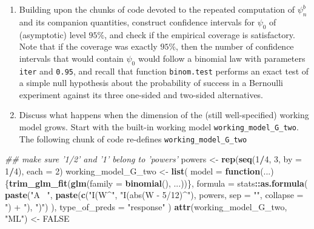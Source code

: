 \documentclass[11pt,openright,twoside]{book}
\newenvironment{Shaded}{\begin{snugshade}}{\end{snugshade}}
\newcommand{\CommentTok}[1]{\textcolor[rgb]{0.56,0.35,0.01}{\textit{#1}}}
\newcommand{\ControlFlowTok}[1]{\textcolor[rgb]{0.13,0.29,0.53}{\textbf{#1}}}
\newcommand{\DataTypeTok}[1]{\textcolor[rgb]{0.13,0.29,0.53}{#1}}
\newcommand{\DecValTok}[1]{\textcolor[rgb]{0.00,0.00,0.81}{#1}}
\newcommand{\KeywordTok}[1]{\textcolor[rgb]{0.13,0.29,0.53}{\textbf{#1}}}
\newcommand{\NormalTok}[1]{#1}
\newcommand{\OperatorTok}[1]{\textcolor[rgb]{0.81,0.36,0.00}{\textbf{#1}}}
\newcommand{\OtherTok}[1]{\textcolor[rgb]{0.56,0.35,0.01}{#1}}
\newcommand{\StringTok}[1]{\textcolor[rgb]{0.31,0.60,0.02}{#1}}
\theoremstyle{definition}
\theoremstyle{definition}
\theoremstyle{definition}
\theoremstyle{remark}
\begin{document}
\begin{enumerate}
\def\labelenumi{\arabic{enumi}.}
\item
  Building upon the chunks of code devoted to the repeated computation of
  \(\psi_{n}^{b}\) and its companion quantities, construct confidence intervals
  for \(\psi_{0}\) of (asymptotic) level \(95\%\), and check if the empirical
  coverage is satisfactory. Note that if the coverage was exactly \(95\%\), then
  the number of confidence intervals that would contain \(\psi_{0}\) would follow
  a binomial law with parameters \texttt{iter} and \texttt{0.95}, and recall that function
  \texttt{binom.test} performs an exact test of a simple null hypothesis about the
  probability of success in a Bernoulli experiment against its three one-sided
  and two-sided alternatives.
\item
  Discuss what happens when the dimension of the (still well-specified) working model grows. Start with the built-in working model \texttt{working\_model\_G\_two}. The following chunk of code re-defines \texttt{working\_model\_G\_two}
\end{enumerate}

\begin{Shaded}
\begin{Highlighting}[]
\CommentTok{## make sure '1/2' and '1' belong to 'powers'}
\NormalTok{powers <-}\StringTok{ }\KeywordTok{rep}\NormalTok{(}\KeywordTok{seq}\NormalTok{(}\DecValTok{1}\OperatorTok{/}\DecValTok{4}\NormalTok{, }\DecValTok{3}\NormalTok{, }\DataTypeTok{by =} \DecValTok{1}\OperatorTok{/}\DecValTok{4}\NormalTok{), }\DataTypeTok{each =} \DecValTok{2}\NormalTok{) }
\NormalTok{working_model_G_two <-}\StringTok{ }\KeywordTok{list}\NormalTok{(}
  \DataTypeTok{model =} \ControlFlowTok{function}\NormalTok{(...) \{}\KeywordTok{trim_glm_fit}\NormalTok{(}\KeywordTok{glm}\NormalTok{(}\DataTypeTok{family =} \KeywordTok{binomial}\NormalTok{(), ...))\},}
  \DataTypeTok{formula =}\NormalTok{ stats}\OperatorTok{::}\KeywordTok{as.formula}\NormalTok{(}
    \KeywordTok{paste}\NormalTok{(}\StringTok{"A ~"}\NormalTok{,}
          \KeywordTok{paste}\NormalTok{(}\KeywordTok{c}\NormalTok{(}\StringTok{"I(W^"}\NormalTok{, }\StringTok{"I(abs(W - 5/12)^"}\NormalTok{),}
\NormalTok{                powers, }
                \DataTypeTok{sep =} \StringTok{""}\NormalTok{, }\DataTypeTok{collapse =} \StringTok{") + "}\NormalTok{),}
          \StringTok{")"}\NormalTok{)}
\NormalTok{  ),}
  \DataTypeTok{type_of_preds =} \StringTok{"response"}
\NormalTok{)}
\KeywordTok{attr}\NormalTok{(working_model_G_two, }\StringTok{"ML"}\NormalTok{) <-}\StringTok{ }\OtherTok{FALSE}
\end{Highlighting}
\end{Shaded}
\end{document}
